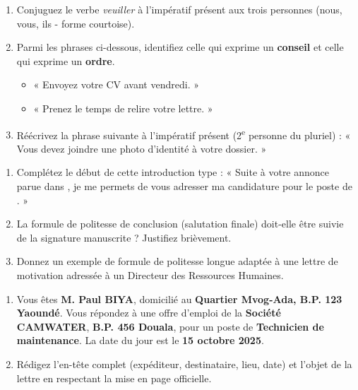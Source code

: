 \documentclass[11pt]{article}
\begin{document}
\begin{exercice}
\begin{enumerate}
    \item Conjuguez le verbe \textit{veuiller} à l'impératif présent aux trois personnes (nous, vous, ils - forme courtoise).
    \item Parmi les phrases ci-dessous, identifiez celle qui exprime un \textbf{conseil} et celle qui exprime un \textbf{ordre}.
    \begin{itemize}
        \item[a.] « Envoyez votre CV avant vendredi. »
        \item[b.] « Prenez le temps de relire votre lettre. »
    \end{itemize}
    \item Réécrivez la phrase suivante à l'impératif présent (2\textsuperscript{e} personne du pluriel) : « Vous devez joindre une photo d'identité à votre dossier. »
\end{enumerate}
\end{exercice}

\begin{exercice}
\begin{enumerate}
    \item Complétez le début de cette introduction type : « Suite à votre annonce parue dans \underline{\hspace{5cm}}, je me permets de vous adresser ma candidature pour le poste de \underline{\hspace{4cm}}. »
    \item La formule de politesse de conclusion (salutation finale) doit-elle être suivie de la signature manuscrite ? Justifiez brièvement.
    \item Donnez un exemple de formule de politesse longue adaptée à une lettre de motivation adressée à un Directeur des Ressources Humaines.
\end{enumerate}
\end{exercice}

\begin{exercice}
\begin{enumerate}
    \item Vous êtes \textbf{M. Paul BIYA}, domicilié au \textbf{Quartier Mvog-Ada, B.P. 123 Yaoundé}. Vous répondez à une offre d'emploi de la \textbf{Société CAMWATER}, \textbf{B.P. 456 Douala}, pour un poste de \textbf{Technicien de maintenance}. La date du jour est le \textbf{15 octobre 2025}.
    \item Rédigez l'en-tête complet (expéditeur, destinataire, lieu, date) et l'objet de la lettre en respectant la mise en page officielle.
\end{enumerate}
\end{exercice}
\end{document}
